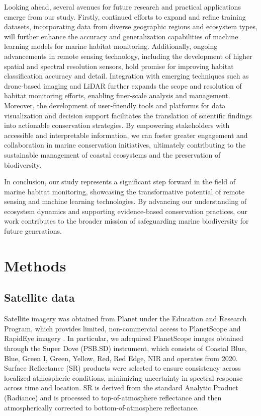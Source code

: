 Looking ahead, several avenues for future research and practical applications
emerge from our study. Firstly, continued efforts to expand and refine training
datasets, incorporating data from diverse geographic regions and ecosystem
types, will further enhance the accuracy and generalization capabilities of
machine learning models for marine habitat monitoring. Additionally, ongoing
advancements in remote sensing technology, including the development of higher
spatial and spectral resolution sensors, hold promise for improving habitat
classification accuracy and detail. Integration with emerging techniques such
as drone-based imaging and LiDAR further expands the scope and resolution of
habitat monitoring efforts, enabling finer-scale analysis and management.
Moreover, the development of user-friendly tools and platforms for data
visualization and decision support facilitates the translation of scientific
findings into actionable conservation strategies. By empowering stakeholders
with accessible and interpretable information, we can foster greater engagement
and collaboration in marine conservation initiatives, ultimately contributing
to the sustainable management of coastal ecosystems and the preservation of
biodiversity.

In conclusion, our study represents a significant step forward in the field of
marine habitat monitoring, showcasing the transformative potential of remote
sensing and machine learning technologies. By advancing our understanding of
ecosystem dynamics and supporting evidence-based conservation practices, our
work contributes to the broader mission of safeguarding marine biodiversity for
future generations.

\section{Methods}

\subsection{Satellite data}

Satellite imagery was obtained from Planet under the Education and Research
Program, which provides limited, non-commercial access to PlanetScope and
RapidEye imagery \cite{planet2017}. In particular, we adcquired PlanetScope
images obtained through the Super Dove (PSB.SD) instrument, which consists of
Coastal Blue, Blue, Green I, Green, Yellow, Red, Red Edge, NIR and operates
from 2020. Surface Reflectance (SR) products were selected to ensure
consistency across localized atmospheric conditions, minimizing uncertainty in
spectral response across time and location. SR is derived from the standard
Analytic Product (Radiance) and is processed to top-of-atmosphere reflectance
and then atmospherically corrected to bottom-of-atmosphere reflectance.

